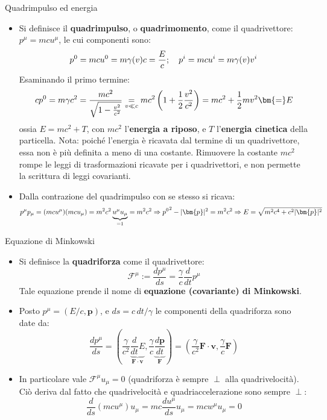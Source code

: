 \documentclass[a4_2,grid,frame]{flashcards}
\newenvironment{cartaflash}
    {\vspace{-15pt}
    \begin{itemize}
    }
    {
    \end{itemize}
    }
\begin{document}
\begin{flashcard}[Definizione]{Quadrimpulso ed energia}
\begin{cartaflash}
\item Si definisce il \textbf{quadrimpulso}, o \textbf{quadrimomento}, come il quadrivettore: $p^\mu = mcu^\mu$, le cui componenti sono:
\vspace{-8pt}
\[
p^0 = mcu^0 =m\gamma(v)c = \frac{E}{c}; \quad p^i = mcu^i = m\gamma(v) v^i
\vspace{-8pt}
\]
Esaminando il primo termine:
\vspace{-8pt}
\[
cp^0 = m\gamma c^2 = \frac{mc^2}{\sqrt{1-\frac{v^2}{c^2}}} \underset{v \ll c}{ = } mc^2 \left (1 + \frac{1}{2}\frac{v^2}{c^2} \right ) = mc^2 + \frac{1}{2}mv^2 \bm{=} E
\vspace{-8pt}
\]
ossia $E = mc^2 + T$, con $mc^2$ l'\textbf{energia a riposo}, e $T$ l'\textbf{energia cinetica} della particella. Nota: poiché l'energia è ricavata dal termine di un quadrivettore, essa non è più definita a meno di una costante. Rimuovere la costante $mc^2$ rompe le leggi di trasformazioni ricavate per i quadrivettori, e non permette la scrittura di leggi covarianti.
\item Dalla contrazione del quadrimpulso con se stesso si ricava:
\vspace{-8pt}
\[
p^\mu p_\mu = (mcu^\mu)(mcu_\mu) = m^2 c^2 \underbrace{u^\mu u_\mu}_{=1} = m^2 c^2 \Rightarrow {p^0}^2 - |\bm{p}|^2 = m^2c^2 \Rightarrow E = \sqrt{m^2c^4 + c^2|\bm{p}|^2}
\vspace{-8pt}
\]
\end{cartaflash}
\end{flashcard}

\begin{flashcard}[Formula]{Equazione di Minkowski}
\begin{cartaflash}
\item Si definisce la \textbf{quadriforza} come il quadrivettore:
\[
\mathcal{F}^\mu := \frac{dp^\mu}{ds} = \frac{\gamma}{c}\frac{d}{dt}p^\mu
\]
Tale equazione prende il nome di \textbf{equazione (covariante) di Minkowski}.
\item Posto $p^\mu = (E/c, \bm{p})$, e $ds = c\,dt/\gamma$ le componenti della quadriforza sono date da:
\[
\frac{dp^\mu}{ds} = \left ( \frac{\gamma}{c^2}\underbrace{\frac{d}{dt}E}_{\bm{F}\cdot \bm{v}}, \frac{\gamma}{c}\underbrace{\frac{d\bm{p}}{dt}}_{\bm{F}} \right ) = \left ( \frac{\gamma}{c^2}\bm{F}\cdot \bm{v}, \frac{\gamma}{c}\bm{F} \right )
\]
\item In particolare vale $\mathcal{F}^\mu u_\mu = 0$ (quadriforza è sempre $\perp$ alla quadrivelocità). Ciò deriva dal fatto che quadrivelocità e quadriaccelerazione sono sempre $\perp$:
\[
\frac{d}{ds}(mcu^\mu)u_\mu = mc\frac{d u^\mu}{ds}u_\mu = mcw^\mu u_\mu = 0
\]
\end{cartaflash}
\end{flashcard}
\end{document}
